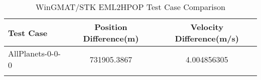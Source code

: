\begin{table}[htbp!]
\centering
\caption{ WinGMAT/STK EML2HPOP Test Case Comparison}
      \begin{tabular}{lcc}
      \hline\hline
          Test Case & Position Difference(m) & Velocity Difference(m/s) \\
         \hline
         AllPlanets-0-0-0 & 731905.3867 & 4.004856305 \\
      \hline\hline
      \label{Table: EML2HPOP WinGMAT-STK Table} 
\end{tabular}
\end{table}

